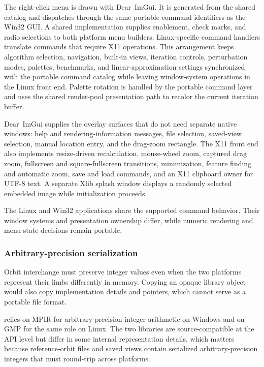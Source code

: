 The right-click menu is drawn with Dear~ImGui. It is generated from the shared
 catalog and dispatches
through the same portable command identifiers as the Win32 GUI. A shared
 implementation supplies enablement, check marks, and radio
selections to both platform menu builders. Linux-specific command handlers
translate commands that require X11 operations. This arrangement keeps algorithm selection,
navigation, built-in views, iteration controls, perturbation modes, palettes,
benchmarks, and linear-approximation settings synchronized with the
portable command catalog while leaving window-system operations in the Linux
front end. Palette rotation is handled by the portable command layer and uses
the shared render-pool presentation path to recolor the current iteration
buffer.

Dear~ImGui supplies the overlay surfaces that do not need separate native
windows: help and rendering-information messages, file selection, saved-view
selection, manual location entry, and the drag-zoom rectangle. The X11 front
end also implements resize-driven recalculation, mouse-wheel zoom, captured
drag zoom, fullscreen and square-fullscreen transitions, minimization, feature
finding and automatic zoom, save and load commands, and an X11 clipboard owner
for UTF-8 text. A separate Xlib splash window displays a randomly selected
embedded image while initialization proceeds.

The Linux and Win32 applications share the supported command behavior. Their
window systems and presentation ownership differ, while numeric rendering and
menu-state decisions remain portable.

\subsubsection{Arbitrary-precision serialization}
\label{subsec:mpir-portability}

Orbit interchange must preserve integer values even when the two platforms
represent their limbs differently in memory. Copying an opaque library object
would also copy implementation details and pointers, which cannot serve as a
portable file format.

\FractalShark{} relies on MPIR for arbitrary-precision integer arithmetic on
Windows and on GMP for the same role on Linux. The two libraries are
source-compatible at the API level but differ in some internal representation
details, which matters because reference-orbit files and saved views contain
serialized arbitrary-precision integers that must round-trip across platforms.

